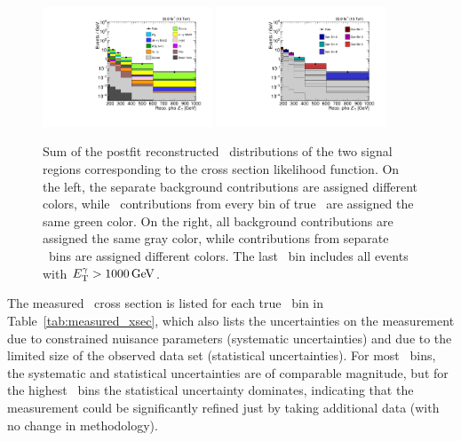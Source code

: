 \begin{figure}[htbp]
  \begin{center}
    \includegraphics[width=0.45\textwidth]{figures/xsec_results/Postfit/postfit_unfolding_b_phoPt.pdf}
    \includegraphics[width=0.45\textwidth]{figures/xsec_results/Postfit/postfit_unfolding_b_genPtAllocation_phoPt.pdf}
    \caption{
      Sum of the postfit reconstructed \ETgamma\ distributions of the two signal regions corresponding to the cross section likelihood function.
      On the left, the separate background contributions are assigned different colors, while \zinvg\ contributions from every bin of true
      \pTgamma\ are assigned the same green color. On the right, all background contributions are assigned the same gray color, while
      contributions from separate \pTgamma\ bins are assigned different colors. The last \ETgamma\ bin includes all events
      with $\ETgamma > 1000\unit{GeV}$.
    }
    \label{fig:postfitXS_combSR}
  \end{center}
\end{figure}

The measured \zinvg\ cross section is listed for each true \pTgamma\ bin in Table~\ref{tab:measured_xsec}, which also lists the uncertainties on the
measurement due to constrained nuisance parameters (systematic uncertainties) and due to the limited size of the observed data set (statistical
uncertainties). For most \pTgamma\ bins, the systematic and statistical uncertainties are of comparable magnitude, but for the highest \pTgamma\ bins
the statistical uncertainty dominates, indicating that the measurement could be significantly refined just by taking additional data (with no change
in methodology).

